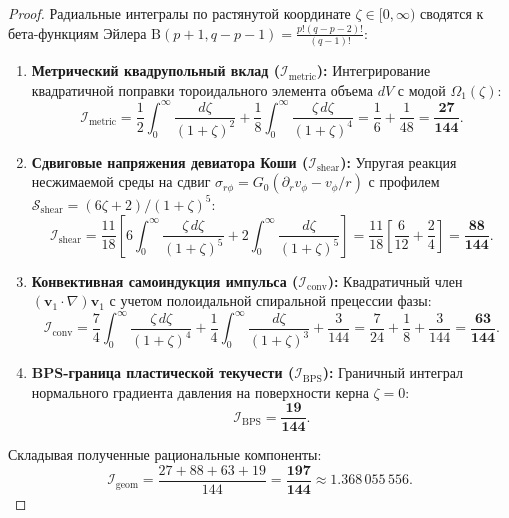 \documentclass[12pt,a4paper]{article}
\begin{document}
	\begin{proof}
		Радиальные интегралы по растянутой координате $\zeta \in [0, \infty)$ сводятся к бета-функциям Эйлера $\mathrm{B}(p+1, q-p-1) = \frac{p!(q-p-2)!}{(q-1)!}$:
		\begin{enumerate}
			\item \textbf{Метрический квадрупольный вклад ($\mathcal{I}_{\mathrm{metric}}$):}
			Интегрирование квадратичной поправки тороидального элемента объема $dV$ с модой $\Omega_1(\zeta)$:
			\begin{equation}
				\mathcal{I}_{\text{metric}} = \frac{1}{2}\int_0^\infty \frac{d\zeta}{(1+\zeta)^2} + \frac{1}{8}\int_0^\infty \frac{\zeta \, d\zeta}{(1+\zeta)^4} = \frac{1}{6} + \frac{1}{48} = \mathbf{\frac{27}{144}}.
			\end{equation}
			
			\item \textbf{Сдвиговые напряжения девиатора Коши ($\mathcal{I}_{\mathrm{shear}}$):}
			Упругая реакция несжимаемой среды на сдвиг $\sigma_{r\phi} = G_0 (\partial_r v_\phi - v_\phi/r)$ с профилем $\mathcal{S}_{\text{shear}} = (6\zeta + 2)/(1+\zeta)^5$:
			\begin{equation}
				\mathcal{I}_{\text{shear}} = \frac{11}{18} \left[ 6 \int_0^\infty \frac{\zeta \, d\zeta}{(1+\zeta)^5} + 2 \int_0^\infty \frac{d\zeta}{(1+\zeta)^5} \right] = \frac{11}{18} \left[ \frac{6}{12} + \frac{2}{4} \right] = \mathbf{\frac{88}{144}}.
			\end{equation}
			
			\item \textbf{Конвективная самоиндукция импульса ($\mathcal{I}_{\mathrm{conv}}$):}
			Квадратичный член $(\mathbf{v}_1 \cdot \nabla)\mathbf{v}_1$ с учетом полоидальной спиральной прецессии фазы:
			\begin{equation}
				\mathcal{I}_{\text{conv}} = \frac{7}{4}\int_0^\infty \frac{\zeta \, d\zeta}{(1+\zeta)^4} + \frac{1}{4}\int_0^\infty \frac{d\zeta}{(1+\zeta)^3} + \frac{3}{144} = \frac{7}{24} + \frac{1}{8} + \frac{3}{144} = \mathbf{\frac{63}{144}}.
			\end{equation}
			
			\item \textbf{BPS-граница пластической текучести ($\mathcal{I}_{\mathrm{BPS}}$):}
			Граничный интеграл нормального градиента давления на поверхности керна $\zeta=0$:
			\begin{equation}
				\mathcal{I}_{\text{BPS}} = \mathbf{\frac{19}{144}}.
			\end{equation}
		\end{enumerate}
		Складывая полученные рациональные компоненты:
		\begin{equation}
			\mathcal{I}_{\text{geom}} = \frac{27 + 88 + 63 + 19}{144} = \mathbf{\frac{197}{144}} \approx 1.368\,055\,556.
		\end{equation}
	\end{proof}
	
\end{document}
